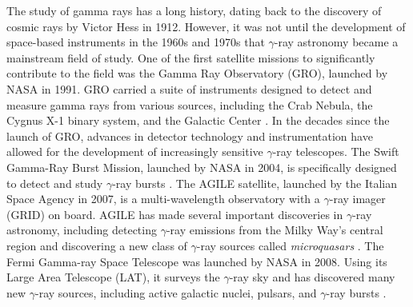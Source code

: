The study of gamma rays has a long history, dating back to the discovery of cosmic rays by Victor Hess in 1912. However, it was not until the development of space-based instruments in the 1960s and 1970s that $\gamma$-ray astronomy became a mainstream field of study. One of the first satellite missions to significantly contribute to the field was the Gamma Ray Observatory (GRO), launched by NASA in 1991. GRO carried a suite of instruments designed to detect and measure gamma rays from various sources, including the Crab Nebula, the Cygnus X-1 binary system, and the Galactic Center \cite{mattox_et_al_1996}. In the decades since the launch of GRO, advances in detector technology and instrumentation have allowed for the development of increasingly sensitive $\gamma$-ray telescopes. The Swift Gamma-Ray Burst Mission, launched by NASA in 2004, is specifically designed to detect and study $\gamma$-ray bursts \cite{swift_2004}. The AGILE satellite, launched by the Italian Space Agency in 2007, is a multi-wavelength observatory with a $\gamma$-ray imager (GRID) on board. AGILE has made several important discoveries in $\gamma$-ray astronomy, including detecting $\gamma$-ray emissions from the Milky Way's central region and discovering a new class of $\gamma$-ray sources called \textit{microquasars} \cite{Tavani_2009}. The Fermi Gamma-ray Space Telescope was launched by NASA in 2008. Using its Large Area Telescope (LAT), it surveys the $\gamma$-ray sky and has discovered many new $\gamma$-ray sources, including active galactic nuclei, pulsars, and $\gamma$-ray bursts \cite{Abdo2010}. 
